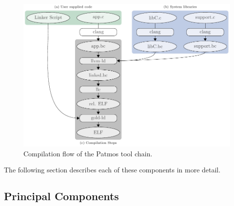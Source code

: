 \begin{figure}[t]
  \centering
  \includegraphics{fig/framework}

  \caption{Compilation flow of the Patmos tool chain.}
  \label{fig:framework}
\end{figure}

The following section describes each of these components in more detail.

\subsection{Principal Components}



